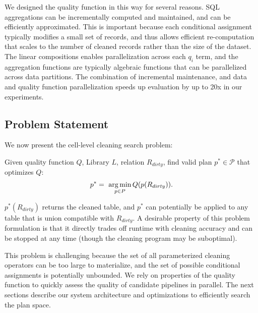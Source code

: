 We designed the quality function in this way for several reasons.  SQL aggregations can be incrementally computed and maintained, and can be efficiently approximated.  This is important because each conditional assignment typically modifies a small set of records, and thus allows efficient re-computation that scales to the number of cleaned records rather than the size of the dataset.  The linear compositions enables parallelization across each $q_i$ term, and the aggregation functions are typically algebraic functions that can be parallelized across data partitions.  The combination of incremental maintenance, and data and quality function parallelization speeds up evaluation by up to 20x in our experiments.





\subsection{Problem Statement}
We now present the cell-level cleaning search problem:
\begin{problem}%
Given quality function $Q$, Library $L$, relation $R_{dirty}$, find valid plan $p^* \in \mathcal{P}$ that optimizes $Q$:
\[
p^* = ~ \operatorname*{arg\,min}_{p \in P} Q( p(R_{dirty}) ).  
\]
\end{problem}
$p^*(R_{dirty})$ returns the cleaned table, and $p^*$ can potentially be applied to any table that is union compatible with $R_{dirty}$.  A desirable property of this problem formulation is that it directly trades off runtime with cleaning accuracy and can be stopped at any time (though the cleaning program may be suboptimal).

This problem is challenging because the set of all parameterized cleaning operators can be too large to materialize, and the set of possible conditional assignments is potentially unbounded.  We  rely on properties of the quality function to quickly assess the quality of candidate pipelines in parallel. The next sections describe our system architecture and optimizations to efficiently search the plan space.



